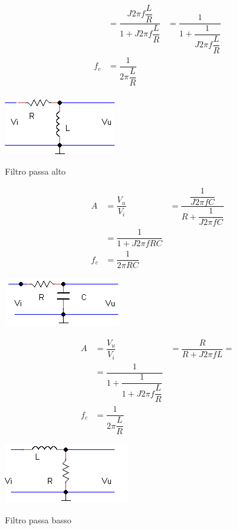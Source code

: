 \begin{table}
\begin{minipage}[t]{0.4\textwidth}
\begin{align*}
&=\dfrac{J2\pi f\dfrac{L}{R}}{1+J2\pi f\dfrac{L}{R}}
&=\dfrac{1}{1+\dfrac{1}{J2\pi f\dfrac{L}{R}}}\\
f_{c}&=\dfrac{1}{2\pi \dfrac{L}{R}}\\
        \end{align*}
     \end{minipage}\hfill
     \begin{minipage}{0.4\textwidth}
      \centering
       \includegraphics{filtro_PA_RL}
     \end{minipage}

\caption{Filtro passa alto}
\end{table}
\begin{table}
\begin{minipage}{0.4\textwidth}
      \centering
       \begin{align*}
A&=\dfrac{V_{u}}{V_{i}}
&=\dfrac{\dfrac{1}{J2\pi fC}}{R+\dfrac{1}{J2\pi fC}}\\
&=\dfrac{1}{1+J2\pi fRC}\\
f_{c}&=\dfrac{1}{2\pi RC}
        \end{align*}
     \end{minipage}\hfill
     \begin{minipage}{0.5\textwidth}
      \centering
       \includegraphics{filtro_PB_RC}
     \end{minipage}
\begin{minipage}{0.4\textwidth}
      \centering
       \begin{align*}
A&=\dfrac{V_{u}}{V_{i}}
&=\dfrac{R}{R+J2\pi fL}=\\
&=\dfrac{1}{1+\dfrac{1}{1+J2\pi f\dfrac{L}{R}}}\\
f_{c}&=\dfrac{1}{2\pi \dfrac{L}{R}}
        \end{align*}
     \end{minipage}\hfill
     \begin{minipage}{0.4\textwidth}
      \centering
       \includegraphics{filtro_PB_LR}
     \end{minipage}
\caption{Filtro passa basso}
\end{table}
